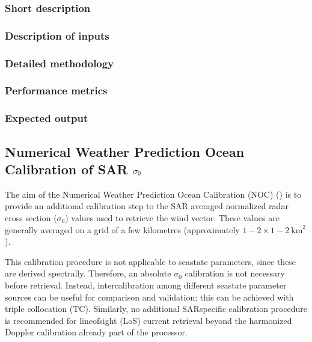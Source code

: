\documentclass[a4paper,10pt,english]{sphinxmanual}
\begin{document}
\subsubsection{Short description}
\label{\detokenize{alg-01-calibration:short-description}}

\subsubsection{Description of inputs}
\label{\detokenize{alg-01-calibration:description-of-inputs}}

\subsubsection{Detailed methodology}
\label{\detokenize{alg-01-calibration:detailed-methodology}}

\subsubsection{Performance metrics}
\label{\detokenize{alg-01-calibration:performance-metrics}}

\subsubsection{Expected output}
\label{\detokenize{alg-01-calibration:expected-output}}

\subsection{Numerical Weather Prediction Ocean Calibration of SAR \protect\(\sigma_0\protect\)}
\label{\detokenize{alg-01-calibration:numerical-weather-prediction-ocean-calibration-of-sar-sigma-0}}
\sphinxAtStartPar
The aim of the Numerical Weather Prediction Ocean Calibration (NOC)
({\hyperref[\detokenize{alg-01-calibration:ref-verspeek-noc}]{}}) is to provide an additional
calibration step to the SAR averaged normalized radar cross section
(\(\sigma_0\)) values used to retrieve the wind vector. These values are
generally averaged on a grid of a few kilometres (approximately
\(1-2 \times 1-2\ \mathrm{km}^2\)).

\sphinxAtStartPar
This calibration procedure is not applicable to sea\sphinxhyphen{}state parameters, since
these are derived spectrally. Therefore, an absolute \(\sigma_0\)
calibration is not necessary before retrieval. Instead, inter\sphinxhyphen{}calibration
among different sea\sphinxhyphen{}state parameter sources can be useful for comparison and
validation; this can be achieved with triple collocation (TC). Similarly, no
additional SAR\sphinxhyphen{}specific calibration procedure is recommended for line\sphinxhyphen{}of\sphinxhyphen{}sight
(LoS) current retrieval beyond the harmonized Doppler calibration already part
of the  processor.
\end{document}
